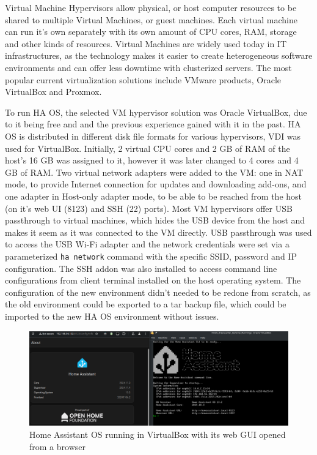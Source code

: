 Virtual Machine Hypervisors allow physical, or host computer resources to be shared to multiple Virtual Machines, or guest machines. \cite{VMwareVM} Each virtual machine can run it's own separately with its own amount of CPU cores, RAM, storage and other kinds of resources. Virtual Machines are widely used today in IT infrastructures, as the technology makes it easier to create heterogeneous software environments and can offer less downtime with clusterized servers. The most popular current virtualization solutions include VMware products, Oracle VirtualBox and Proxmox. \cite{G2freeVM}

To run HA OS, the selected VM hypervisor solution was Oracle VirtualBox, due to it being free and and the previous experience gained with it in the past. HA OS is distributed in different disk file formats for various hypervisors, VDI was used for VirtualBox. %
Initially, 2 virtual CPU cores and 2 GB of RAM of the host's 16 GB was assigned to it, however it was later changed to 4 cores and 4 GB of RAM. Two virtual network adapters were added to the VM: one in NAT mode, to provide Internet connection for updates and downloading add-ons, and one adapter in Host-only adapter mode, to be able to be reached from the host (on it's web UI (8123) and SSH (22) ports). Most VM hypervisors offer USB passthrough to virtual machines, which hides the USB device from the host and makes it seem as it was connected to the VM directly. USB passthrough was used to access the USB Wi-Fi adapter and the network credentials were set via a parameterized \verb+ha network+ command with the specific SSID, password and IP configuration. The SSH addon was also installed to access command line configurations from client terminal installed on the host operating system. The configuration of the new environment didn't needed to be redone from scratch, as the old environment could be exported to a tar backup file, which could be imported to the new HA OS environment without issues.

\begin{figure}[!ht]
  \centering
  \includegraphics[width=150mm, keepaspectratio]{figures/homeassistant_about.png}
  \caption{Home Assistant OS running in VirtualBox with its web GUI opened from a browser}
  \label{fig:HAabout}
\end{figure}

